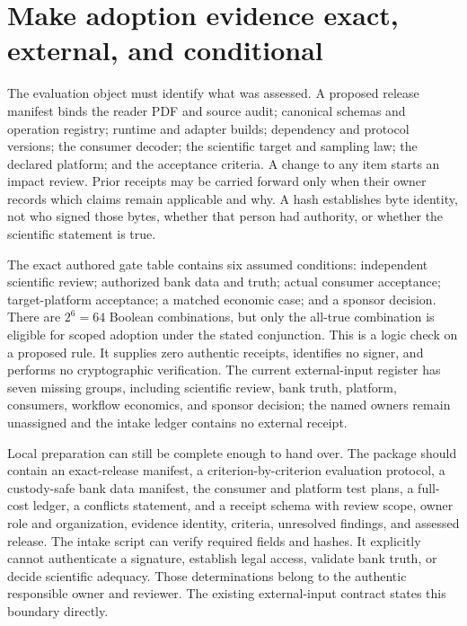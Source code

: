 \section{Make adoption evidence exact, external, and conditional}
\label{exec17:signed-adoption}

The evaluation object must identify what was assessed. A proposed release
manifest binds the reader PDF and source audit; canonical schemas and operation
registry; runtime and adapter builds; dependency and protocol versions; the
consumer decoder; the scientific target and sampling law; the declared
platform; and the acceptance criteria. A change to any item starts an impact
review. Prior receipts may be carried forward only when their owner records
which claims remain applicable and why. A hash establishes byte identity, not
who signed those bytes, whether that person had authority, or whether the
scientific statement is true.

The exact authored gate table contains six assumed conditions: independent
scientific review; authorized bank data and truth; actual consumer acceptance;
target-platform acceptance; a matched economic case; and a sponsor decision.
There are $2^6=64$ Boolean combinations, but only the all-true combination is
eligible for scoped adoption under the stated conjunction. This is a logic
check on a proposed rule. It supplies zero authentic receipts, identifies no
signer, and performs no cryptographic verification. The current external-input
register has seven missing groups, including scientific review, bank truth,
platform, consumers, workflow economics, and sponsor decision; the named
owners remain unassigned and the intake ledger contains no external
receipt.\citep{exec17_continuity_reference,exec17_continuity_contract}

Local preparation can still be complete enough to hand over. The package
should contain an exact-release manifest, a criterion-by-criterion evaluation
protocol, a custody-safe bank data manifest, the consumer and platform test
plans, a full-cost ledger, a conflicts statement, and a receipt schema with
review scope, owner role and organization, evidence identity, criteria,
unresolved findings, and assessed release. The intake script can verify
required fields and hashes. It explicitly cannot authenticate a signature,
establish legal access, validate bank truth, or decide scientific adequacy.
Those determinations belong to the authentic responsible owner and reviewer.
The existing external-input contract states this boundary directly.
\citep{exec17_continuity_contract}

